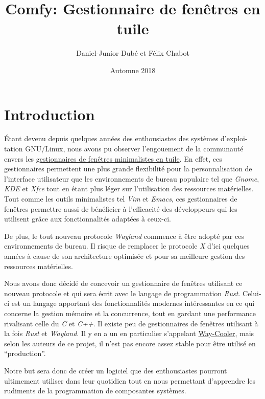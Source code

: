 \documentclass[titlepage]{article}
\title{Comfy: Gestionnaire de fenêtres en tuile}
\author{Daniel-Junior Dubé et Félix Chabot}
\date{Automne 2018}
\begin{document}
    \maketitle

    \renewcommand{\contentsname}{Table des matières}
    \tableofcontents
    \newpage

    \section{Introduction}
    \par
    Étant devenu depuis quelques années des enthousiastes des systèmes d'exploi-tation GNU/Linux, nous avons pu observer l’engouement de la communauté envers les \href{https://en.wikipedia.org/wiki/Tiling_window_manager}{gestionnaires de fenêtres minimalistes en tuile}. En effet, ces gestionnaires permettent une plus grande flexibilité pour la personnalisation de l’interface utilisateur que les environnements de bureau populaire tel que \textit{Gnome}, \textit{KDE} et \textit{Xfce} tout en étant plus léger sur l’utilisation des ressources matérielles. Tout comme les outils minimalistes tel \textit{Vim} et \textit{Emacs}, ces gestionnaires de fenêtres permettre aussi de bénéficier à l’efficacité des développeurs qui les utilisent grâce aux fonctionnalités adaptées à ceux-ci.

    \par
    \bigskip
    De plus, le tout nouveau protocole \textit{Wayland} commence à être adopté par ces environnements de bureau. Il risque de remplacer le protocole \textit{X} d'ici quelques années à cause de son architecture optimisée et pour sa meilleure gestion des ressources matérielles.

    \par
    \bigskip
    Nous avons donc décidé de concevoir un gestionnaire de fenêtres utilisant ce nouveau protocole et qui sera écrit avec le langage de programmation \textit{Rust}. Celui-ci est un langage apportant des fonctionnalités modernes intéressantes en ce qui concerne la gestion mémoire et la concurrence, tout en gardant une performance rivalisant celle du \textit{C} et \textit{C++}. Il existe peu de gestionnaires de fenêtres utilisant à la fois \textit{Rust} et \textit{Wayland}. Il y en a un en particulier s’appelant \href{http://way-cooler.org/}{Way-Cooler}, mais selon les auteurs de ce projet, il n’est pas encore assez stable pour être utilisé en “production”.

    \par
    \bigskip
    Notre but sera donc de créer un logiciel que des enthousiastes pourront ultimement utiliser dans leur quotidien tout en nous permettant d’apprendre les rudiments de la programmation de composantes systèmes.
\end{document}
